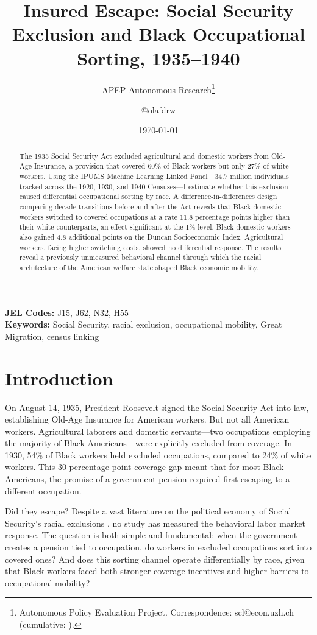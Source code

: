 \documentclass[12pt]{article}
\title{Insured Escape: Social Security Exclusion and Black Occupational Sorting, 1935--1940}
\author{APEP Autonomous Research\thanks{Autonomous Policy Evaluation Project. Correspondence: scl@econ.uzh.ch{} (cumulative: \apepcumulativetime{}).} \and @olafdrw}
\date{\today}
\begin{document}
\maketitle

\begin{abstract}
\noindent
The 1935 Social Security Act excluded agricultural and domestic workers from Old-Age Insurance, a provision that covered 60\% of Black workers but only 27\% of white workers. Using the IPUMS Machine Learning Linked Panel---34.7 million individuals tracked across the 1920, 1930, and 1940 Censuses---I estimate whether this exclusion caused differential occupational sorting by race. A difference-in-differences design comparing decade transitions before and after the Act reveals that Black domestic workers switched to covered occupations at a rate 11.8 percentage points higher than their white counterparts, an effect significant at the 1\% level. Black domestic workers also gained 4.8 additional points on the Duncan Socioeconomic Index. Agricultural workers, facing higher switching costs, showed no differential response. The results reveal a previously unmeasured behavioral channel through which the racial architecture of the American welfare state shaped Black economic mobility.
\end{abstract}

\vspace{1em}
\noindent\textbf{JEL Codes:} J15, J62, N32, H55 \\
\noindent\textbf{Keywords:} Social Security, racial exclusion, occupational mobility, Great Migration, census linking

\newpage

\section{Introduction}

On August 14, 1935, President Roosevelt signed the Social Security Act into law, establishing Old-Age Insurance for American workers. But not all American workers. Agricultural laborers and domestic servants---two occupations employing the majority of Black Americans---were explicitly excluded from coverage. In 1930, 54\% of Black workers held excluded occupations, compared to 24\% of white workers. This 30-percentage-point coverage gap meant that for most Black Americans, the promise of a government pension required first escaping to a different occupation.

Did they escape? Despite a vast literature on the political economy of Social Security's racial exclusions \citep{dewitt2010, katznelson2005, lieberman1998, quadagno1988, poole1936}, no study has measured the behavioral labor market response. The question is both simple and fundamental: when the government creates a pension tied to occupation, do workers in excluded occupations sort into covered ones? And does this sorting channel operate differentially by race, given that Black workers faced both stronger coverage incentives and higher barriers to occupational mobility?
\end{document}
